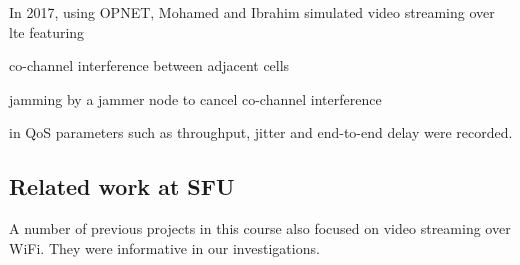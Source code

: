 In 2017, using \gls{OPNET}, Mohamed and Ibrahim simulated video streaming over \gls{lte} featuring \begin{itemize*}
	\item co-channel interference between adjacent cells
	\item jamming by a jammer node to cancel co-channel interference
\end{itemize*} in \cite{8275396} \gls{QoS} parameters such as throughput, jitter and end-to-end delay were recorded. 

\subsection{Related work at SFU} \label{subsec:background:related}
A number of previous projects in this course also focused on video streaming over \gls{WiFi}. They were informative in our investigations.

